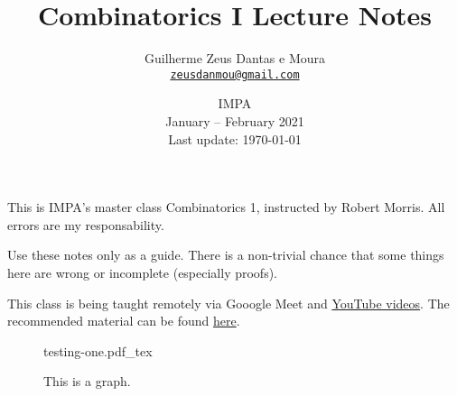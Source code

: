 \documentclass[a4paper, 10pt]{article}
\title{\sffamily \bfseries Combinatorics I Lecture Notes}
\author{\sc Guilherme Zeus Dantas e Moura\\\href{mailto:zeusdanmou@gmail.com}{\texttt{zeusdanmou@gmail.com}}}
\date{IMPA\\[3pt] January -- February 2021\\[3pt] Last update: \today}
\newcommand{\incfig}[2][1]{%
    \def\svgwidth{#1\columnwidth}
    {#2.pdf_tex}
}
\begin{document}
    \maketitle
	\sloppy
	
		This is IMPA's master class Combinatorics 1, instructed by Robert Morris.
		All errors are my responsability.

		Use these notes only as a guide. There is a non-trivial chance that some things here are wrong or incomplete (especially proofs).

		This class is being taught remotely via Gooogle Meet and \href{https://www.youtube.com/playlist?list=PLo4jXE-LdDTSkmHd3xNGhcObfWXvpwmCL}{YouTube videos}. The recommended material can be found \href{https://impa.br/wp-content/uploads/2017/04/28CBM_04.pdf}{here}.

		\hfill

		\begin{figure}[h]
			\centering
			\incfig[.8]{testing-one}
			\caption{This is a graph.}
			\label{fig:testing-one}
		\end{figure}

		\hfill

	\newpage
	\tableofcontents

	\newpage
    
    
    
\end{document}
